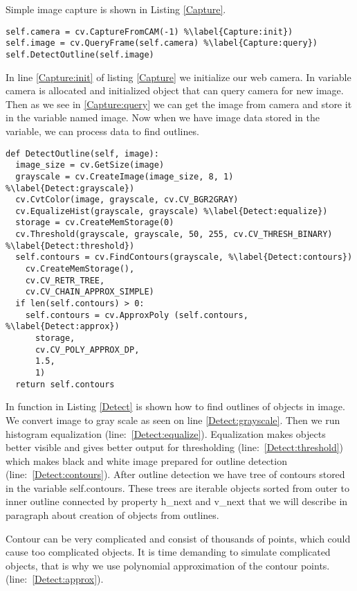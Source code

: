 \documentclass{ifacconf}
\begin{document}
Simple image capture is shown in Listing \ref{Capture}.
\begin{lstlisting}[caption=Query image frame from web camera, label=Capture]
self.camera = cv.CaptureFromCAM(-1) %\label{Capture:init})
self.image = cv.QueryFrame(self.camera) %\label{Capture:query})
self.DetectOutline(self.image)
\end{lstlisting}
In line \ref{Capture:init} of listing \ref{Capture} we initialize our web
camera. In variable camera is allocated and initialized object that can query
camera for new image. Then as we see in \ref{Capture:query} we can get the
image from camera and store it in the variable named image. Now when we have
image data stored in the variable, we can process data to find outlines.
\begin{lstlisting}[caption=Outline detection, label=Detect]
def DetectOutline(self, image):
  image_size = cv.GetSize(image)
  grayscale = cv.CreateImage(image_size, 8, 1)	%\label{Detect:grayscale})
  cv.CvtColor(image, grayscale, cv.CV_BGR2GRAY)
  cv.EqualizeHist(grayscale, grayscale)	%\label{Detect:equalize})
  storage = cv.CreateMemStorage(0)
  cv.Threshold(grayscale, grayscale, 50, 255, cv.CV_THRESH_BINARY) %\label{Detect:threshold})
  self.contours = cv.FindContours(grayscale, %\label{Detect:contours})
    cv.CreateMemStorage(),
    cv.CV_RETR_TREE,
    cv.CV_CHAIN_APPROX_SIMPLE)
  if len(self.contours) > 0:
    self.contours = cv.ApproxPoly (self.contours, %\label{Detect:approx})
      storage,
      cv.CV_POLY_APPROX_DP,
      1.5,
      1)
  return self.contours
\end{lstlisting}
In function in Listing \ref{Detect} is shown how to find outlines of objects in
image. We convert image to gray scale as seen on line \ref{Detect:grayscale}.
Then we run histogram equalization (line:~\ref{Detect:equalize}).
Equalization makes objects better visible and gives better output for
thresholding (line:~\ref{Detect:threshold}) which makes black and white image
prepared for outline detection (line:~\ref{Detect:contours}).
After outline detection we have tree of contours stored in the variable
self.contours. These trees are iterable objects sorted from outer to inner
outline connected by property h\_next and v\_next that we will describe in
paragraph about creation of objects from outlines.

Contour can be very complicated and consist of thousands of points, which could
cause too complicated objects. It is time demanding to simulate complicated
objects, that is why we use polynomial approximation of the contour points.
(line:~\ref{Detect:approx}).
\end{document}
